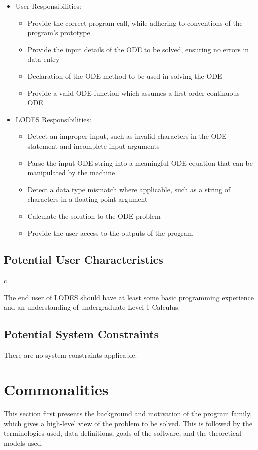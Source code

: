 \documentclass[12pt]{article}
\newcommand{\famname}{LODES} %
\begin{document}
\begin{itemize}
\item User Responsibilities:
\begin{itemize}
\item Provide the correct program call, while adhering to conventions of the program's prototype
\item Provide the input details of the ODE to be solved, ensuring no errors in data entry
\item Declaration of the ODE method to be used in solving the ODE
\item Provide a valid ODE function which assumes a first order continuous ODE
\end{itemize}
\item \famname{} Responsibilities:
\begin{itemize}
\item Detect an improper input, such as invalid characters in the ODE statement and incomplete input arguments
\item Parse the input ODE string into a meaningful ODE equation that can be manipulated by the machine
\item Detect a data type mismatch where applicable, such as a string of characters in a floating point argument
\item Calculate the solution to the ODE problem
\item Provide the user access to the outputs of the program
\end{itemize}
\end{itemize}

\subsection{Potential User Characteristics} c

The end user of \famname{} should have at least some basic programming experience and
an understanding of undergraduate Level 1 Calculus.

\subsection{Potential System Constraints}

There are no system constraints applicable.

\section{Commonalities}
This section first presents the background and motivation of the program family, which gives a
high-level view of the problem to be solved.  This is followed by the terminologies used, data
definitions, goals of the software, and the theoretical models used. 
\end{document}

